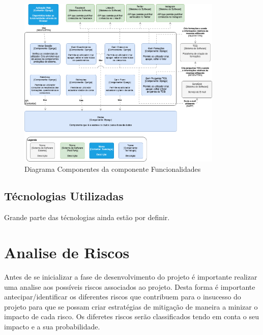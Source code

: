 \begin{figure}[ht!]
	\begin{center}
		\includegraphics[width=0.87\textwidth]{img/arq/diagrama-componentes1}
		\caption{Diagrama Componentes da componente Funcionalidades}
		\label{fig:arq-componentes1}
	\end{center}
\end{figure}

\newpage





\subsection{Técnologias Utilizadas}

Grande parte das técnologias ainda estão por definir.

\section{Analise de Riscos}
\label{analiseriscos}

Antes de se inicializar a fase de desenvolvimento do projeto é importante realizar uma analise aos possíveis riscos associados ao projeto. Desta forma é importante antecipar/identificar os diferentes riscos que contribuem para o insucesso do projeto para que se possam criar estratégias de mitigação de maneira a minizar o impacto de cada risco. Os diferetes riscos serão classificados tendo em conta o seu impacto e a sua probabilidade.

